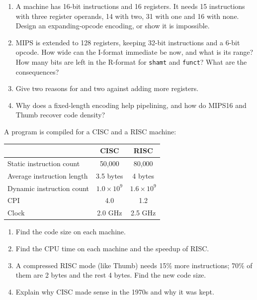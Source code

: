 \begin{exercise}\label{q:isa-format}
\leavevmode
\begin{enumerate}[label=(\alph*),leftmargin=*]
  \item A machine has 16-bit instructions and 16 registers. It needs 15
  instructions with three register operands, 14 with two, 31 with one and 16
  with none. Design an expanding-opcode encoding, or show it is impossible.
  \item MIPS is extended to 128 registers, keeping 32-bit instructions and a
  6-bit opcode. How wide can the I-format immediate be now, and what is its
  range? How many bits are left in the R-format for \texttt{shamt} and
  \texttt{funct}? What are the consequences?
  \item Give two reasons for and two against adding more registers.
  \item Why does a fixed-length encoding help pipelining, and how do MIPS16 and
  Thumb recover code density?
\end{enumerate}
\end{exercise}

\begin{exercise}\label{q:isa-cisc}
A program is compiled for a CISC and a RISC machine:
\begin{center}
\begin{tabular}{@{}lcc@{}}
\toprule
& CISC & RISC \\
\midrule
Static instruction count & 50{,}000 & 80{,}000 \\
Average instruction length & 3.5 bytes & 4 bytes \\
Dynamic instruction count & $1.0\times10^9$ & $1.6\times10^9$ \\
CPI & 4.0 & 1.2 \\
Clock & 2.0 GHz & 2.5 GHz \\
\bottomrule
\end{tabular}
\end{center}
\begin{enumerate}[label=(\alph*),leftmargin=*]
  \item Find the code size on each machine.
  \item Find the CPU time on each machine and the speedup of RISC.
  \item A compressed RISC mode (like Thumb) needs 15\% more instructions;
  70\% of them are 2 bytes and the rest 4 bytes. Find the new code size.
  \item Explain why CISC made sense in the 1970s and why it was kept.
\end{enumerate}
\end{exercise}

